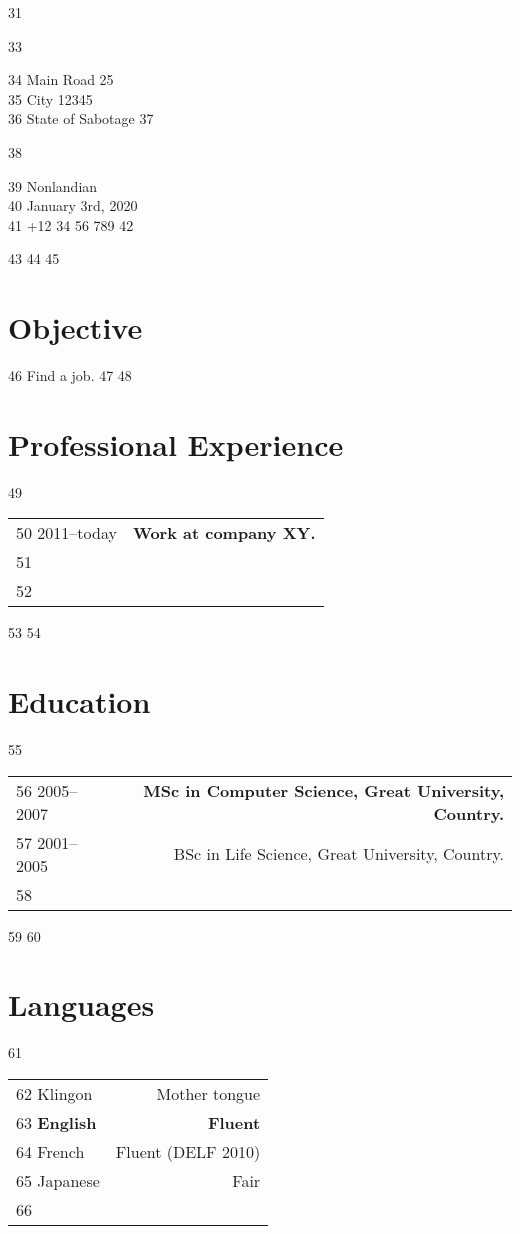 \documentclass[10pt]{article}
\begin{document}
31		\vspace{1em}
33	\begin{minipage}[ht]{0.48\textwidth}
34	Main Road 25\\
35	City 12345\\
36	State of Sabotage
37	\end{minipage}
38	\begin{minipage}[ht]{0.48\textwidth}
39	Nonlandian\\
40	January 3rd, 2020\\
41	+12 34 56 789
42	\end{minipage}
43	\vspace{20pt}
44	 
45	\section*{Objective}
46	Find a job.
47	 
48	\section*{Professional Experience}
49	\begin{tabular}{L!{\VRule}R}
50	2011--today&{\bf Work at company XY.}\\
51	&\lipsum[66]\\
52	\end{tabular}
53	 
54	\section*{Education}
55	\begin{tabular}{L!{\VRule}R}
56	2005--2007&{\bf MSc in Computer Science, Great University, Country.}\vspace{5pt}\\
57	2001--2005&BSc in Life Science, Great University, Country.\\
58	\end{tabular}
59	 
60	\section*{Languages}
61	\begin{tabular}{L!{\VRule}R}
62	Klingon&Mother tongue\\
63	{\bf English}&{\bf Fluent}\\
64	French&Fluent (DELF 2010)\\
65	Japanese&Fair\\
66	\end{tabular}
\end{document}
